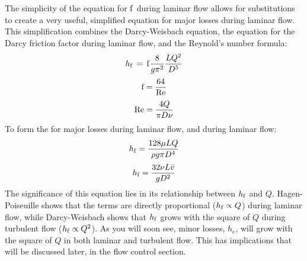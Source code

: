 \documentclass[letterpaper,10pt,english]{sphinxmanual}
\begin{document}
The simplicity of the equation for \(\rm{f}\) during laminar flow allows for substitutions to create a very useful, simplified equation for major losses during laminar flow. This simplification combines the Darcy-Weisbach equation, the equation for the Darcy friction factor during laminar flow, and the Reynold’s number formula:
\begin{equation}\label{equation:Fluids_Review/Fluids_Review_Design:Fluids_Review/Fluids_Review_Design:13}
\begin{split}h_{\rm{f}} \, = \,{\rm{f}} \frac{8}{g \pi^2} \frac{LQ^2}{D^5}\end{split}
\end{equation}\begin{equation}\label{equation:Fluids_Review/Fluids_Review_Design:Fluids_Review/Fluids_Review_Design:14}
\begin{split}{\rm{f}} = \frac{64}{\rm{Re}}\end{split}
\end{equation}\begin{equation}\label{equation:Fluids_Review/Fluids_Review_Design:Fluids_Review/Fluids_Review_Design:15}
\begin{split}{\rm{Re}}=\frac{4Q}{\pi D\nu}\end{split}
\end{equation}
To form the  for major losses during laminar flow, and  during laminar flow:
\begin{equation}\label{equation:Fluids_Review/Fluids_Review_Design:Fluids_Review/Fluids_Review_Design:16}
\begin{split}h_{\rm{f}} = \frac{128\mu L Q}{\rho g\pi D^4}\end{split}
\end{equation}\begin{equation}\label{equation:Fluids_Review/Fluids_Review_Design:Fluids_Review/Fluids_Review_Design:17}
\begin{split}h_{\rm{f}} = \frac{32\nu L\bar v}{ g D^2}\end{split}
\end{equation}
The significance of this equation lies in its relationship between \(h_{\rm{f}}\) and \(Q\). Hagen-Poiseuille shows that the terms are directly proportional (\(h_{\rm{f}} \propto Q\)) during laminar flow, while Darcy-Weisbach shows that \(h_{\rm{f}}\) grows with the square of \(Q\) during turbulent flow (\(h_{\rm{f}} \propto Q^2\)). As you will soon see, minor losses, \(h_e\), will grow with the square of \(Q\) in both laminar and turbulent flow. This has implications that will be discussed later, in the flow control section.
\end{document}
